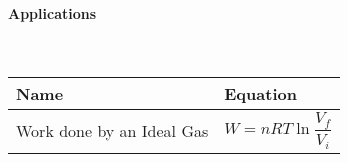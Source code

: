 \documentclass{article}
\begin{document}
\paragraph{Applications}\

\begin{tabularx}{\textwidth}{l | X }
Name & Equation \\
\hline\hline

Work done by an Ideal Gas & \begin{equation*}
    W = nRT\ln{\frac{V_f}{V_i}}
\end{equation*} & \\
\hline
\end{tabularx}
\end{document}

